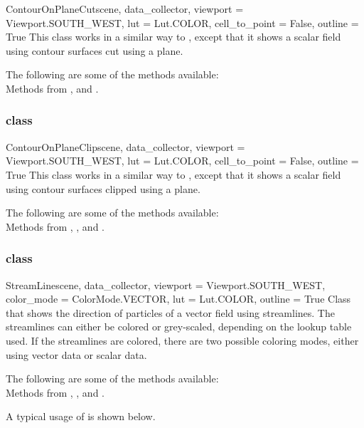 \begin{classdesc}{ContourOnPlaneCut}{scene, data_collector,
viewport = Viewport.SOUTH_WEST, lut = Lut.COLOR, cell_to_point = False, 
outline = True}
This class works in a similar way to \MapOnPlaneCut, except that it shows a
scalar field using contour surfaces cut using a plane.
\end{classdesc}

The following are some of the methods available:\\
Methods from \ActorThreeD, \ContourModule and \Transform. 

\subsubsection{\ContourOnPlaneClip class}

\begin{classdesc}{ContourOnPlaneClip}{scene, data_collector, 
viewport = Viewport.SOUTH_WEST, lut = Lut.COLOR, cell_to_point = False, 
outline = True}
This class works in a similar way to \MapOnPlaneClip, except that it shows a 
scalar field using contour surfaces clipped using a plane.
\end{classdesc}

The following are some of the methods available:\\
Methods from \ActorThreeD, \ContourModule, \Transform and \Clipper. 

\subsubsection{\StreamLine class}

\begin{classdesc}{StreamLine}{scene, data_collector,
viewport = Viewport.SOUTH_WEST, color_mode = ColorMode.VECTOR, lut = Lut.COLOR,
outline = True}
Class that shows the direction of particles of a vector field using streamlines.
The streamlines can either be colored or grey-scaled, depending on the lookup
table used. If the streamlines are colored, there are two possible coloring 
modes, either using vector data or scalar data.
\end{classdesc}

The following are some of the methods available:\\
Methods from \ActorThreeD, \PointSource, \StreamLineModule and \Tube. 

A typical usage of \StreamLine is shown below.

